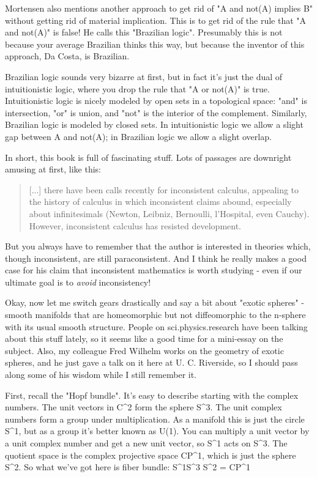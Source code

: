 Mortensen also mentions another approach to get rid of "A and
not(A) implies B" without getting rid of material implication.
This is to get rid of the rule that "A and not(A)" is false!
He calls this "Brazilian logic".  Presumably this is not
because your average Brazilian thinks this way, but because the inventor
of this approach, Da Costa, is Brazilian.

Brazilian logic sounds very bizarre at first, but in fact it's just the
dual of intuitionistic logic, where you drop the rule that "A or
not(A)" is true.  Intuitionistic logic is nicely modeled by open
sets in a topological space: "and" is intersection,
"or" is union, and "not" is the interior of the
complement.  Similarly, Brazilian logic is modeled by closed sets.  In
intuitionistic logic we allow a slight gap between A and not(A); in
Brazilian logic we allow a slight overlap.

In short, this book is full of fascinating stuff.  Lots of passages are
downright amusing at first, like this: 

\begin{quote}
     [...] there have been calls recently for inconsistent calculus,
     appealing to the history of calculus in which inconsistent claims
     abound, especially about infinitesimals (Newton, Leibniz,
     Bernoulli, l'Hospital, even Cauchy).  However, inconsistent
     calculus has resisted development.

\end{quote}
But you always have to remember that the author is interested in
theories which, though inconsistent, are still paraconsistent.  And I
think he really makes a good case for his claim that inconsistent
mathematics is worth studying - even if our ultimate goal is to \emph{avoid}
inconsistency! 

Okay, now let me switch gears drastically and say a bit about "exotic
spheres" - smooth manifolds that are homeomorphic but not diffeomorphic
to the n-sphere with its usual smooth structure.  People on
sci.physics.research have been talking about this stuff lately, so it
seems like a good time for a mini-essay on the subject.  Also, my
colleague Fred Wilhelm works on the geometry of exotic spheres, and he
just gave a talk on it here at U. C. Riverside, so I should pass along
some of his wisdom while I still remember it.  

First, recall the "Hopf bundle".  It's easy to describe
starting with the complex numbers.  The unit vectors in C^2 form the
sphere S^{3}.  The unit complex numbers form a group under multiplication.
As a manifold this is just the circle S^{1}, but as a group it's better
known as U(1).  You can multiply a unit vector by a unit complex number
and get a new unit vector, so S^{1} acts on S^{3}.  The quotient space is
the complex projective space CP^{1}, 
which is just the sphere S^{2}.  So
what we've got here is fiber bundle:
S^{1}\to  S^{3} \to  S^{2} = CP^{1}


